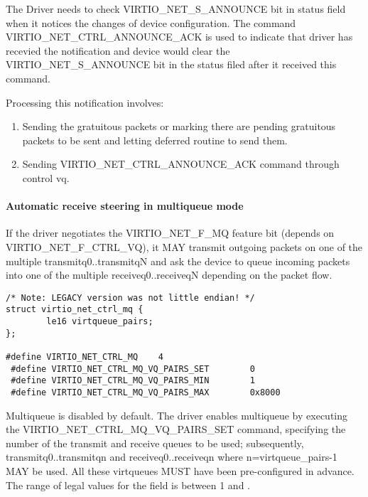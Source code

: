 The Driver needs to check VIRTIO_NET_S_ANNOUNCE bit in status
field when it notices the changes of device configuration. The
command VIRTIO_NET_CTRL_ANNOUNCE_ACK is used to indicate that
driver has recevied the notification and device would clear the
VIRTIO_NET_S_ANNOUNCE bit in the status filed after it received
this command.

Processing this notification involves:

\begin{enumerate}
\item Sending the gratuitous packets or marking there are pending
  gratuitous packets to be sent and letting deferred routine to
  send them.

\item Sending VIRTIO_NET_CTRL_ANNOUNCE_ACK command through control
  vq.
\end{enumerate}

\paragraph{Automatic receive steering in multiqueue mode}\label{sec:Device Types / Network Device / Device Operation / Control Virtqueue / Automatic receive steering in multiqueue mode}

If the driver negotiates the VIRTIO_NET_F_MQ feature bit (depends
on VIRTIO_NET_F_CTRL_VQ), it MAY transmit outgoing packets on one
of the multiple transmitq0..transmitqN and ask the device to
queue incoming packets into one of the multiple receiveq0..receiveqN
depending on the packet flow.

\begin{lstlisting}
/* Note: LEGACY version was not little endian! */
struct virtio_net_ctrl_mq {
        le16 virtqueue_pairs;
};

#define VIRTIO_NET_CTRL_MQ    4
 #define VIRTIO_NET_CTRL_MQ_VQ_PAIRS_SET        0
 #define VIRTIO_NET_CTRL_MQ_VQ_PAIRS_MIN        1
 #define VIRTIO_NET_CTRL_MQ_VQ_PAIRS_MAX        0x8000
\end{lstlisting}

Multiqueue is disabled by default. The driver enables multiqueue by
executing the VIRTIO_NET_CTRL_MQ_VQ_PAIRS_SET command, specifying
the number of the transmit and receive queues to be used; subsequently,
transmitq0..transmitqn and receiveq0..receiveqn where
n=virtqueue_pairs-1 MAY be used. All these virtqueues MUST have
been pre-configured in advance. The range of legal values for the
 field is between 1 and .

